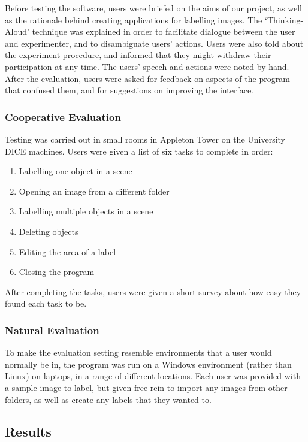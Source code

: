 \documentclass[11pt,twocolumn]{article}
\begin{document}
Before testing the software, users were briefed on the aims of our project, as
well as the rationale behind creating applications for labelling images. The
`Thinking-Aloud' technique was explained in order to facilitate dialogue
between the user and experimenter, and to disambiguate users’ actions. Users
were also told about the experiment procedure, and informed that they might
withdraw their participation at any time. The users’ speech and actions were
noted by hand. After the evaluation, users were asked for feedback on aspects
of the program that confused them, and for suggestions on improving the
interface.

\subsubsection{Cooperative Evaluation}

Testing was carried out in small rooms in Appleton Tower on the University DICE
machines. Users were given a list of six tasks to complete in order:

\begin{enumerate}
\item Labelling one object in a scene
\item Opening an image from a different folder
\item Labelling multiple objects in a scene
\item Deleting objects
\item Editing the area of a label
\item Closing the program
\end{enumerate}
 
After completing the tasks, users were given a short survey about how easy they
found each task to be. 

\subsubsection{Natural Evaluation}

To make the evaluation setting resemble environments that a user would normally
be in, the program was run on a Windows environment (rather than Linux) on
laptops, in a range of different locations. Each user was provided with a
sample image to label, but given free rein to import any images from other
folders, as well as create any labels that they wanted to. 

\subsection{Results}
\end{document}
